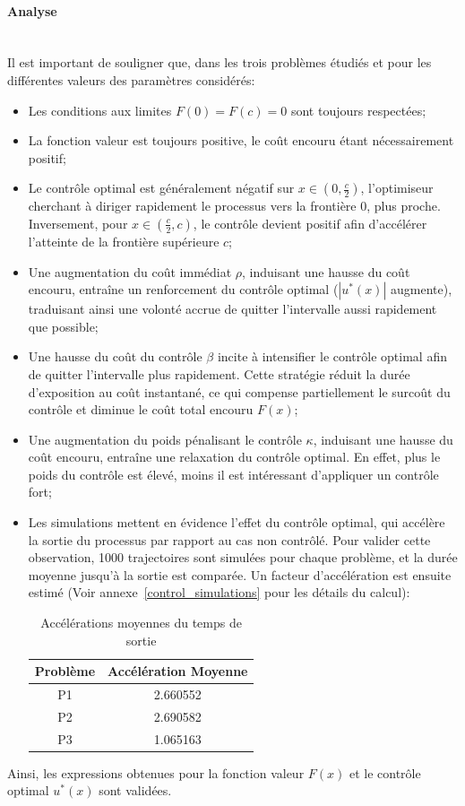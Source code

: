 \paragraph{Analyse}\phantom{}\\
Il est important de souligner que, dans les trois problèmes étudiés et pour les différentes valeurs des paramètres considérés:
\begin{itemize}
    \item Les conditions aux limites $F(0)=F(c)=0$ sont toujours respectées;
    \item La fonction valeur est toujours positive, le coût encouru étant nécessairement positif;
    \item Le contrôle optimal est généralement négatif sur \( x \in \left(0, \frac{c}{2}\right) \), l'optimiseur cherchant à diriger rapidement le processus vers la frontière \( 0 \), plus proche. Inversement, pour \( x \in \left(\frac{c}{2}, c\right) \), le contrôle devient positif afin d'accélérer l'atteinte de la frontière supérieure \( c \);
    \item Une augmentation du coût immédiat $\rho$, induisant une hausse du coût encouru, entraîne un renforcement du contrôle optimal ($|u^*(x)|$ augmente), traduisant ainsi une volonté accrue de quitter l'intervalle aussi rapidement que possible;
    \item Une hausse du coût du contrôle $\beta$ incite à intensifier le contrôle optimal afin de quitter l'intervalle plus rapidement. Cette stratégie réduit la durée d'exposition au coût instantané, ce qui compense partiellement le surcoût du contrôle et diminue le coût total encouru $F(x)$;
    \item Une augmentation du poids pénalisant le contrôle $\kappa$, induisant une hausse du coût encouru, entraîne une relaxation du contrôle optimal. En effet, plus le poids du contrôle est élevé, moins il est intéressant d'appliquer un contrôle fort;
    \item Les simulations mettent en évidence l'effet du contrôle optimal, qui accélère la sortie du processus par rapport au cas non contrôlé. Pour valider cette observation, 1000 trajectoires sont simulées pour chaque problème, et la durée moyenne jusqu'à la sortie est comparée. Un facteur d'accélération est ensuite estimé (Voir annexe~\ref{control_simulations} pour les détails du calcul):
    \begin{table}[htb]
        \centering
        \caption{Accélérations moyennes du temps de sortie}\label{tab:acceleration_results}
        \renewcommand{\arraystretch}{1.1}
        \begin{tabular}{||c|c||}
        \hline
        Problème & Accélération Moyenne \\\hline\hline
        P1 & 2.660552 \\
        P2 & 2.690582 \\
        P3 & 1.065163 \\\hline
        \end{tabular}
    \end{table}\FloatBarrier
\end{itemize}
Ainsi, les expressions obtenues pour la fonction valeur $F(x)$ et le contrôle optimal $u^*(x)$ sont validées.

